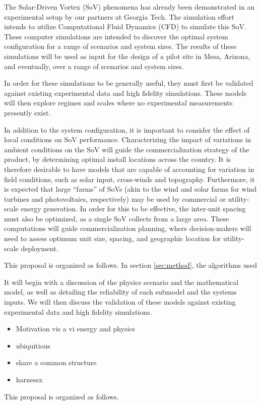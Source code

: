 The Solar-Driven Vortex (SoV) phenomena has already been demonstrated in
an experimental setup by our partners at Georgia Tech. The simulation
effort intends to utilize Computational Fluid Dynamics (CFD) to simulate
this SoV. These computer simulations are intended to discover the optimal
system configuration for a range of scenarios and system sizes. The
results of these simulations will be used as input for the design of a
pilot site in Mesa, Arizona, and eventually, over a range of
scenarios and system sizes. 

In order for these simulations to be generally useful, they must first
be validated against existing experimental data and high fidelity
simulations. These models will then explore regimes and scales where no
experimental measurements presently exist. 


In addition to the system configuration, it is important to consider the
effect of local conditions on SoV performance. Characterizing the impact
of variations in ambient conditions on the SoV will guide the
commercialization strategy of the product, by determining optimal
install locations across the country. It is therefore desirable to have models
that are capable of accounting for variation in field conditions, such as solar
input, cross-winds and topography. Furthermore, it is expected that 
large ``farms'' of SoVs (akin to the wind and solar farms for wind
turbines and photovoltaics, respectively) may be used by commercial or
utility-scale energy generation. In order for this to be effective, 
the inter-unit spacing must also be optimized, as a single SoV collects
from a large area. These computations will guide commercialization
planning, where decision-makers will need to assess optimum unit size,
spacing, and geographic location for utility-scale deployment.  

This proposal is organized as follows. 
In section \ref{sec:method},
the algorithms used 


It will begin with a discussion of the
physics scenario and the mathematical model, as well as detailing the
reliability of each submodel and the systems inputs. We will then
discuss the validation of these models against existing experimental
data and high fidelity simulations. 

\begin{itemize}
\item Motivation vis a vi energy and physics
\item ubiquitious
\item share a common structure
\item harnessx
\end{itemize}



This proposal is organized as follows. 
